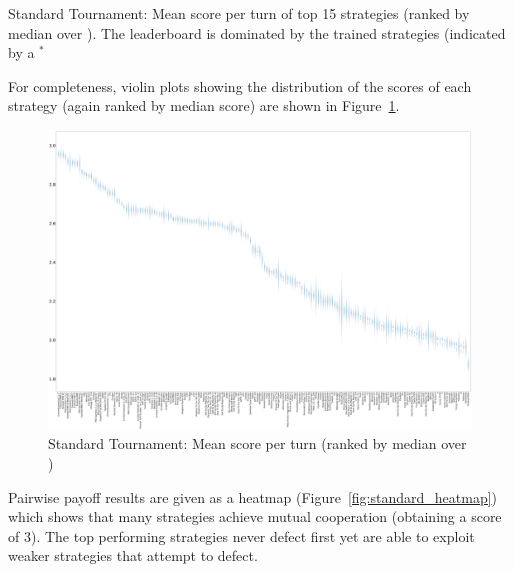 \documentclass{article}
\begin{document}
\begin{table}[!hbtp]
        \centering
        
        \caption{Standard Tournament: Mean score per turn of top 15 strategies
            (ranked by median over
        \protecttournaments).
        The leaderboard is dominated by the trained strategies (indicated by a
        $^{*}$}
        \label{tbl:standard_score}
\end{table}

For completeness, violin plots showing the distribution of the scores of each
strategy (again ranked by median score) are shown in
Figure~\ref{fig:standard_boxplot}.

\begin{landscape}
    \begin{figure}[!hbtp]
        \centering
        \includegraphics[width=\paperwidth]{./assets/standard_scores_boxplots.pdf}
        \caption{Standard Tournament: Mean score per turn (ranked by median
        over
        \protecttournaments)}
        \label{fig:standard_boxplot}
    \end{figure}
\end{landscape}

Pairwise payoff results are given as a heatmap (Figure~\ref{fig:standard_heatmap})
which shows that many strategies achieve mutual cooperation (obtaining a score of 3). The top performing
strategies never defect first yet are able to exploit weaker strategies that
attempt to defect.
\end{document}
